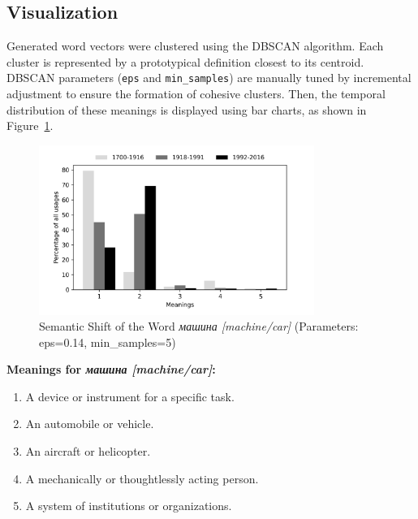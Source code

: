 \documentclass[11pt]{article}
\begin{document}

\subsection{Visualization}

Generated word vectors were clustered using the DBSCAN algorithm.
Each cluster is represented by a prototypical definition closest to its centroid.
DBSCAN parameters (\texttt{eps} and \texttt{min\_samples}) are manually tuned by incremental adjustment to ensure the formation of cohesive clusters.
Then, the temporal distribution of these meanings is displayed using bar charts, as shown in Figure~\ref{fig:Машина_example}.

\begin{figure}[H]
    \centering
    \includegraphics[width=0.8\textwidth]{img/mashina_minimal}
    \caption{Semantic Shift of the Word \textit{машина [machine/car]} (Parameters: eps=0.14, min\_samples=5)}
    \label{fig:Машина_example}
\end{figure}

\begin{center}
    \begin{minipage}{0.7\textwidth}
        \centering
        \textbf{Meanings for \textit{машина [machine/car]}:}
        \begin{enumerate}
            \item A device or instrument for a specific task.
            \item An automobile or vehicle.
            \item An aircraft or helicopter.
            \item A mechanically or thoughtlessly acting person.
            \item A system of institutions or organizations.
    \end{enumerate}
    \end{minipage}
\end{center}
\end{document}
